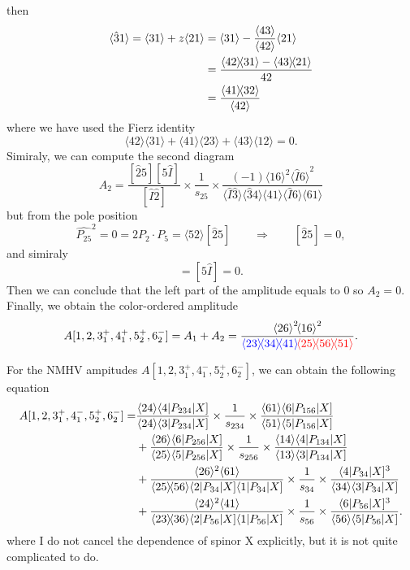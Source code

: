 \documentclass[12pt]{article}
\numberwithin{equation}{section}
\newcommand{\mdavg}[2]{\langle #1 \rangle\!\langle #2 \rangle}
\newcommand{\avg}[1]{\langle #1 \rangle}
\newcommand{\asqu}[1]{{\langle#1\rangle}^2}
\newcommand{\cbrak}[2]{\avg{#1}\![#2]}
\newcommand{\asbra}[3]{\langle #1 | #2 |#3 ]}
\begin{document}
then
\begin{align}
    \avg{\hat{3}1}=\avg{31}+z\avg{21}&=\avg{31}-\frac{\avg{43}}{\avg{42}}\avg{21}\notag\\
    &=\frac{\mdavg{42}{31}-\mdavg{43}{21}}{42}\notag\\
    &=\frac{\mdavg{41}{32}}{\avg{42}}
\end{align}
where we have used the Fierz identity
\begin{equation}
    \mdavg{42}{31}+\mdavg{41}{23}+\mdavg{43}{12}=0.
\end{equation}
Simiraly, we can compute the second diagram
\begin{equation}
    A_2=\frac{[\hat{2}5][5\hat{I}]}{[\hat{I}\hat{2}]}\times\frac{1}{s_{25}}\times \frac{(-1)\asqu{16}\asqu{\hat{I}6}}{\mdavg{\hat{I}\hat{3}}{\hat{3}4}
    \!\mdavg{41}{\hat{I}6}\!\avg{61}}
\end{equation}
but from the pole position
\begin{equation}
    \hat{P_{25}}^2=0=2P_2\cdot P_5=\cbrak{52}{\hat{2}5}\qquad\Rightarrow \qquad [\hat{2}5]=0,
\end{equation}
and simiraly
\begin{equation}
    [\hat{2}\hat{I}]=[5\hat{I}]=0.
\end{equation}
Then we can conclude that the left part of the amplitude equals to 0 so $A_2=0$. Finally, we obtain the color-ordered amplitude 
\begin{equation}
    A[1,2,3_1^+,4_1^+,5_2^+,6_2^-]=A_1+A_2=\frac{\asqu{26}\!\asqu{16}}{\textcolor{blue}{\mdavg{23}{34}\!\avg{41}}\!\textcolor{red}{\mdavg{25}{56}\!\avg{51}}}.
\end{equation}

For the NMHV ampitudes $A[1,2,3_1^+,4_1^-,5_2^+,6_2^-]$, we can obtain the following equation
\begin{align}
    A[1,2,3_1^+,4_1^-,5_2^+,6_2^-] =& \frac{\avg{24}\asbra{4}{P_{234}}{X}}{\avg{24}\asbra{3}{P_{234}}{X}}\times\frac{1}{s_{234}}\times\frac{\avg{61}\asbra{6}{P_{156}}{X}}{\avg{51}\asbra{5}{P_{156}}{X}}\notag\\
    &+\frac{\avg{26}\asbra{6}{P_{256}}{X}}{\avg{25}\asbra{5}{P_{256}}{X}}\times\frac{1}{s_{256}}\times\frac{\avg{14}\asbra{4}{P_{134}}{X}}{\avg{13}\asbra{3}{P_{134}}{X}}\notag\\
    &+\frac{\avg{26}^2\avg{61}}{\mdavg{25}{56}\asbra{2}{P_{34}}{X}\asbra{1}{P_{34}}{X}}\times\frac{1}{s_{34}}\times\frac{\asbra{4}{P_{34}}{X}^3}{\avg{34}\asbra{3}{P_{34}}{X}}\notag\\
    &+\frac{\avg{24}^2\avg{41}}{\mdavg{23}{36}\asbra{2}{P_{56}}{X}\asbra{1}{P_{56}}{X}}\times\frac{1}{s_{56}}\times\frac{\asbra{6}{P_{56}}{X}^3}{\avg{56}\asbra{5}{P_{56}}{X}}.
\end{align}
where I do not cancel the dependence of spinor X explicitly, but it is not quite complicated to do.
\end{document}
